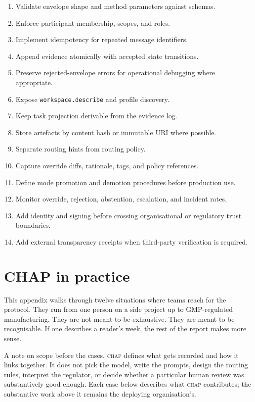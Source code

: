\documentclass[11pt]{article}
\newcommand{\chap}{\textsc{chap}}
\begin{document}
\begin{enumerate}[leftmargin=*]
    \item Validate envelope shape and method parameters against schemas.
    \item Enforce participant membership, scopes, and roles.
    \item Implement idempotency for repeated message identifiers.
    \item Append evidence atomically with accepted state transitions.
    \item Preserve rejected-envelope errors for operational debugging where appropriate.
    \item Expose \texttt{workspace.describe} and profile discovery.
    \item Keep task projection derivable from the evidence log.
    \item Store artefacts by content hash or immutable URI where possible.
    \item Separate routing hints from routing policy.
    \item Capture override diffs, rationale, tags, and policy references.
    \item Define mode promotion and demotion procedures before production use.
    \item Monitor override, rejection, abstention, escalation, and incident rates.
    \item Add identity and signing before crossing organisational or regulatory trust boundaries.
    \item Add external transparency receipts when third-party verification is required.
\end{enumerate}

\section{CHAP in practice}
\label{app:applications}

This appendix walks through twelve situations where teams reach for the protocol. They run from one person on a side project up to GMP-regulated manufacturing. They are not meant to be exhaustive. They are meant to be recognisable. If one describes a reader's week, the rest of the report makes more sense.

A note on scope before the cases. \chap{} defines what gets recorded and how it links together. It does not pick the model, write the prompts, design the routing rules, interpret the regulator, or decide whether a particular human review was substantively good enough. Each case below describes what \chap{} contributes; the substantive work above it remains the deploying organisation's.
\end{document}
